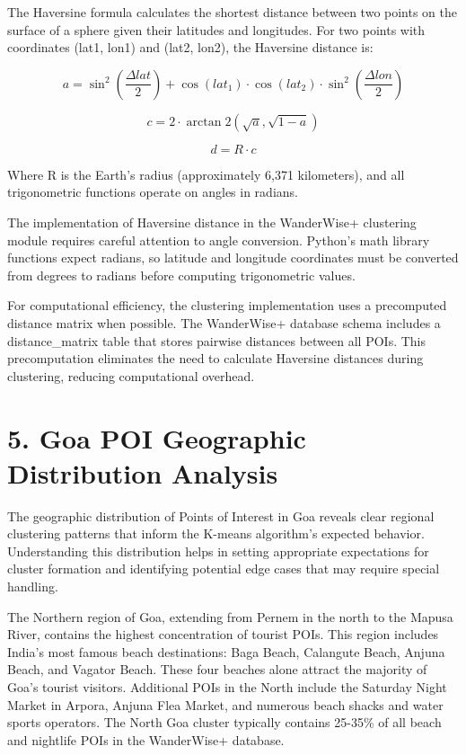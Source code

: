 The Haversine formula calculates the shortest distance between two points on the surface of a sphere given their latitudes and longitudes. For two points with coordinates (lat1, lon1) and (lat2, lon2), the Haversine distance is:

\begin{equation}
a = \sin^2\left(\frac{\Delta lat}{2}\right) + \cos(lat_1) \cdot \cos(lat_2) \cdot \sin^2\left(\frac{\Delta lon}{2}\right)
\end{equation}

\begin{equation}
c = 2 \cdot \arctan2\left(\sqrt{a}, \sqrt{1-a}\right)
\end{equation}

\begin{equation}
d = R \cdot c
\end{equation}

Where R is the Earth's radius (approximately 6,371 kilometers), and all trigonometric functions operate on angles in radians.

The implementation of Haversine distance in the WanderWise+ clustering module requires careful attention to angle conversion. Python's math library functions expect radians, so latitude and longitude coordinates must be converted from degrees to radians before computing trigonometric values.

For computational efficiency, the clustering implementation uses a precomputed distance matrix when possible. The WanderWise+ database schema includes a distance\_matrix table that stores pairwise distances between all POIs. This precomputation eliminates the need to calculate Haversine distances during clustering, reducing computational overhead.

\section{5. Goa POI Geographic Distribution Analysis}

The geographic distribution of Points of Interest in Goa reveals clear regional clustering patterns that inform the K-means algorithm's expected behavior. Understanding this distribution helps in setting appropriate expectations for cluster formation and identifying potential edge cases that may require special handling.

The Northern region of Goa, extending from Pernem in the north to the Mapusa River, contains the highest concentration of tourist POIs. This region includes India's most famous beach destinations: Baga Beach, Calangute Beach, Anjuna Beach, and Vagator Beach. These four beaches alone attract the majority of Goa's tourist visitors. Additional POIs in the North include the Saturday Night Market in Arpora, Anjuna Flea Market, and numerous beach shacks and water sports operators. The North Goa cluster typically contains 25-35\% of all beach and nightlife POIs in the WanderWise+ database.

